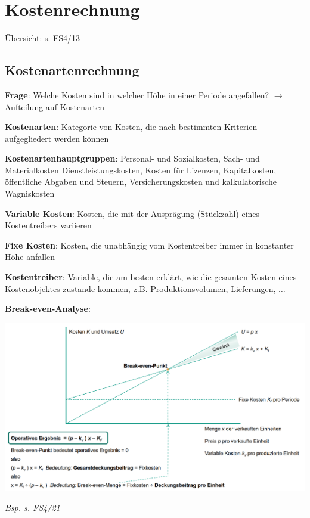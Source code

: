 \section{Kostenrechnung}
Übersicht: s. FS4/13
\subsection{Kostenartenrechnung}
\textbf{Frage}: Welche Kosten sind in welcher Höhe in einer Periode angefallen? 
$\rightarrow$ Aufteilung auf Kostenarten

\textbf{Kostenarten}: Kategorie von Kosten, die nach bestimmten Kriterien aufgegliedert werden können

\textbf{Kostenartenhauptgruppen}: Personal- und Sozialkosten, Sach- und Materialkosten
Dienstleistungskosten, Kosten für Lizenzen, Kapitalkosten, öffentliche Abgaben und Steuern, Versicherungskosten und kalkulatorische Wagniskosten

\textbf{Variable Kosten}: Kosten, die mit der Ausprägung (Stückzahl) eines Kostentreibers variieren

\textbf{Fixe Kosten}: Kosten, die unabhängig vom Kostentreiber immer in konstanter Höhe anfallen

\textbf{Kostentreiber}: Variable, die am besten erklärt, wie die gesamten Kosten eines Kostenobjektes zustande kommen, z.B. Produktionsvolumen, Lieferungen, $\ldots$

\textbf{Break-even-Analyse}:
\begin{center}
	\includegraphics[width=\textwidth]{images/be-analyse.png}
\end{center}
\textit{Bsp. s. FS4/21}

